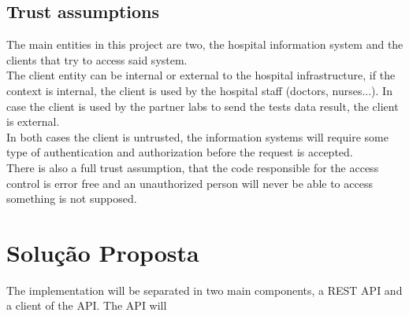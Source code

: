\subsection{Trust assumptions}

The main entities in this project are two, the hospital information system and the clients that try to access said system. \\

The client entity can be internal or external to the hospital infrastructure, if the context is internal, the client is used by the hospital staff (doctors, nurses...). In case the client is used by the partner labs to send the tests data result, the client is external. \\

In both cases the client is untrusted, the information systems will require some type of authentication and authorization before the request is accepted. \\ 

There is also a full trust assumption, that the code responsible for the access control is error free and an unauthorized person will never be able to access something is not supposed. \\

\section{Solução Proposta}

The implementation will be separated in two main components, a REST API and a client of the API.
The API will 

